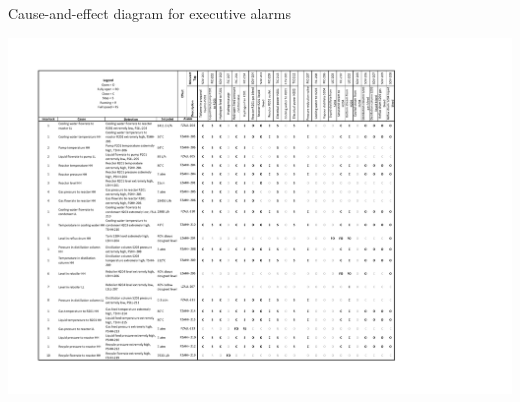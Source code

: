 \begin{landscape}

\begin{table}
\label{tab:causeandeffects}
  \caption{Cause-and-effect diagram for executive alarms}
\includegraphics[clip, trim=1cm 0cm 1cm 1cm, width=\linewidth]{chapters/4-operation-control/4-Figures/Cause-and-effects.pdf}
\end{table}

\end{landscape}
